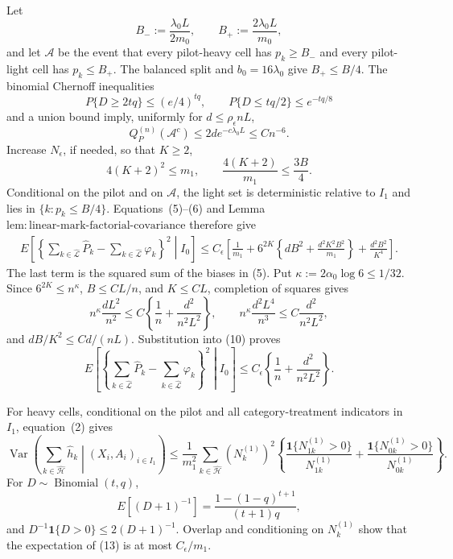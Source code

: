 Let
\[
 B_-:=\frac{\lambda_0L}{2m_0},\qquad
 B_+:=\frac{2\lambda_0L}{m_0},
\]
and let \(\mathcal A\) be the event that every pilot-heavy cell has \(p_k\ge B_-\) and every pilot-light cell has \(p_k\le B_+\).  The balanced split and \(b_0=16\lambda_0\) give \(B_+\le B/4\).  The binomial Chernoff inequalities
\[
 P\{D\ge2tq\}\le(e/4)^{tq},\qquad
 P\{D\le tq/2\}\le e^{-tq/8}
\tag{7}
\]
and a union bound imply, uniformly for \(d\le\rho_{\epsilon}nL\),
\[
 Q_P^{(n)}(\mathcal A^c)\le2d e^{-c\lambda_0L}\le Cn^{-6}.
\tag{8}
\]
Increase \(N_{\epsilon}\), if needed, so that \(K\ge2\),
\[
 4(K+2)^2\le m_1,\qquad
 \frac{4(K+2)}{m_1}\le\frac{3B}{4}.
\tag{9}
\]
Conditional on the pilot and on \(\mathcal A\), the light set is deterministic relative to \(I_1\) and lies in \(\{k:p_k\le B/4\}\).  Equations~(5)--(6) and Lemma~\(\mathrm{lem:linear\text{-}mark\text{-}factorial\text{-}covariance}\) therefore give
\[
\begin{aligned}
 E\!\left[\left\{\sum_{k\in\widehat{\mathcal L}}\widehat P_k
 -\sum_{k\in\widehat{\mathcal L}}\varphi_k\right\}^2\middle|I_0\right]
 \le C_{\epsilon}\left[
 \frac1{m_1}+6^{2K}\left\{dB^2+\frac{d^2K^2B^2}{m_1}\right\}
 +\frac{d^2B^2}{K^4}\right].
\end{aligned}
\tag{10}
\]
The last term is the squared sum of the biases in (5).  Put \(\kappa:=2\alpha_0\log6\le1/32\).  Since \(6^{2K}\le n^{\kappa}\), \(B\le CL/n\), and \(K\le CL\), completion of squares gives
\[
 n^{\kappa}\frac{dL^2}{n^2}
 \le C\left\{\frac1n+\frac{d^2}{n^2L^2}\right\},
 \qquad
 n^{\kappa}\frac{d^2L^4}{n^3}
 \le C\frac{d^2}{n^2L^2},
\tag{11}
\]
and \(dB/K^2\le Cd/(nL)\).  Substitution into (10) proves
\[
 E\!\left[\left\{\sum_{k\in\widehat{\mathcal L}}\widehat P_k
 -\sum_{k\in\widehat{\mathcal L}}\varphi_k\right\}^2\middle|I_0\right]
 \le C_{\epsilon}\left\{\frac1n+\frac{d^2}{n^2L^2}\right\}.
\tag{12}
\]

For heavy cells, conditional on the pilot and all category-treatment indicators in \(I_1\), equation~(2) gives
\[
 \operatorname{Var}\!\left(\sum_{k\in\widehat{\mathcal H}}\widehat h_k
 \middle|(X_i,A_i)_{i\in I_1}\right)
 \le\frac1{m_1^2}\sum_{k\in\widehat{\mathcal H}}(N_k^{(1)})^2
 \left\{\frac{\mathbf1\{N_{1k}^{(1)}>0\}}{N_{1k}^{(1)}}+
 \frac{\mathbf1\{N_{0k}^{(1)}>0\}}{N_{0k}^{(1)}}\right\}.
\tag{13}
\]
For \(D\sim\operatorname{Binomial}(t,q)\),
\[
 E[(D+1)^{-1}]=\frac{1-(1-q)^{t+1}}{(t+1)q},
\tag{14}
\]
and \(D^{-1}\mathbf1\{D>0\}\le2(D+1)^{-1}\).  Overlap and conditioning on \(N_k^{(1)}\) show that the expectation of (13) is at most \(C_{\epsilon}/m_1\).

